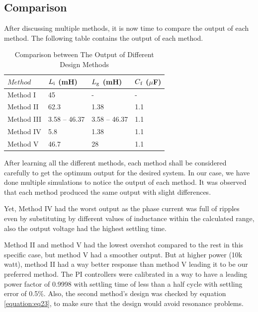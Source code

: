 \documentclass[12pt,a4paper]{book}
\begin{document}
\subsection{Comparison}
After discussing multiple methods, it is now time to compare the output of each method. The following table contains the output of each method.

\begin{table}[h!]
  \centering
  \begin{tabular}{p{3.5cm} p{3.5cm} p{3.5cm} p{3.5cm}} 
   \hline
   $Method$ & $L\textsubscript{i}$ (mH) & $L\textsubscript{g}$ (mH) & $C\textsubscript{f}$ (\(\mu\)F) \\ [0.5ex] 
   \hline
   Method I & 45 & - & - \\
   Method II & 62.3 & 1.38 & 1.1 \\
   Method III & 3.58 -- 46.37 & 3.58 -- 46.37 & 1.1 \\
   Method IV & 5.8 & 1.38 & 1.1 \\
   Method V & 46.7 & 28 & 1.1 \\[1ex] 
   \hline
  \end{tabular}
  \caption{Comparison between The Output of Different Design Methods}
\end{table}
After learning all the different methods, each method shall be considered carefully to get the optimum output for the desired system. In our case, we have done multiple simulations to notice the output of each method. It was observed that each method produced the same output with slight differences. 

Yet, Method IV had the worst output as the phase current was full of ripples even by substituting by different values of inductance within the calculated range, also the output voltage had the highest settling time.

Method II and method V had the lowest overshot compared to the rest in this specific case, but method V had a smoother output. But at higher power (10k watt), method II had a way better response than method V leading it to be our preferred method. The PI controllers were calibrated in a way to have a leading power factor of 0.9998 with settling time of less than a half cycle with settling error of 0.5\%. Also, the second method’s design was checked by equation \ref{equation:eq23}, to make sure that the design would avoid resonance problems. 
\end{document}

